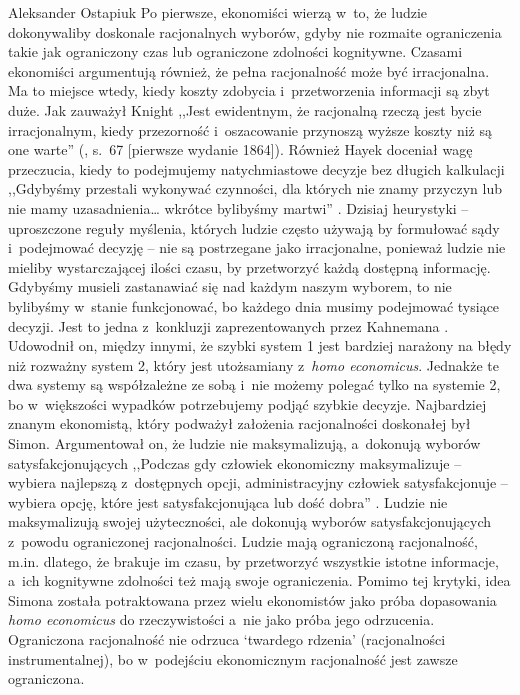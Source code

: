 \begin{artplenv}{Aleksander Ostapiuk}
Po pierwsze, ekonomiści wierzą w~to, że ludzie dokonywaliby doskonale racjonalnych wyborów, gdyby nie rozmaite
ograniczenia takie jak ograniczony czas lub ograniczone zdolności kognitywne. Czasami ekonomiści argumentują również,
że pełna racjonalność może być irracjonalna. Ma to miejsce wtedy, kiedy koszty zdobycia i~przetworzenia informacji są
zbyt duże. Jak zauważył Knight ,,Jest ewidentnym, że racjonalną rzeczą jest bycie irracjonalnym, kiedy
przezorność i~oszacowanie przynoszą wyższe koszty niż są one warte''
(\cite{knight_risk_1921}, s.~67 [pierwsze wydanie 1864]).
Również Hayek doceniał wagę przeczucia, kiedy to podejmujemy natychmiastowe decyzje bez długich
kalkulacji ,,Gdybyśmy przestali wykonywać czynności, dla których nie znamy przyczyn lub nie mamy uzasadnienia… wkrótce
bylibyśmy martwi''
\parencite[s.~68]{hayek_fatal_1988}.
Dzisiaj heurystyki -- uproszczone reguły myślenia,
których ludzie często używają by formułować sądy i~podejmować decyzję -- nie są postrzegane jako irracjonalne, ponieważ
ludzie nie mieliby wystarczającej ilości czasu, by przetworzyć każdą dostępną informację. Gdybyśmy musieli zastanawiać
się nad każdym naszym wyborem, to nie bylibyśmy w~stanie funkcjonować, bo każdego dnia musimy podejmować tysiące
decyzji. Jest to jedna z~konkluzji zaprezentowanych przez Kahnemana
\parencite{kahneman_pulapki_2012}.
Udowodnił on,
między innymi, że szybki system 1 jest bardziej narażony na błędy niż rozważny system 2, który jest
utożsamiany z~\textit{homo economicus}. Jednakże te dwa systemy są współzależne ze sobą i~nie możemy
polegać tylko na systemie 2, bo
w~większości wypadków potrzebujemy podjąć szybkie decyzje. Najbardziej znanym ekonomistą, który podważył założenia
racjonalności doskonałej był Simon. Argumentował on, że ludzie nie maksymalizują, a~dokonują wyborów
satysfakcjonujących ,,Podczas gdy człowiek ekonomiczny maksymalizuje -- wybiera najlepszą z~dostępnych opcji,
administracyjny człowiek satysfakcjonuje -- wybiera opcję, które jest satysfakcjonująca lub dość dobra''
\parencite[s.~XXIX]{simon_administrative_1947}.
Ludzie nie maksymalizują swojej użyteczności, ale dokonują wyborów
satysfakcjonujących z~powodu ograniczonej racjonalności. Ludzie mają ograniczoną racjonalność, m.in. dlatego, że
brakuje im czasu, by przetworzyć wszystkie istotne informacje, a~ich kognitywne zdolności też mają swoje ograniczenia.
Pomimo tej krytyki, idea Simona została potraktowana przez wielu ekonomistów jako próba dopasowania \textit{homo
economicus} do rzeczywistości a~nie jako próba jego odrzucenia. Ograniczona racjonalność nie odrzuca `twardego rdzenia'
(racjonalności instrumentalnej), bo w~podejściu ekonomicznym racjonalność jest zawsze ograniczona.


\end{artplenv}
